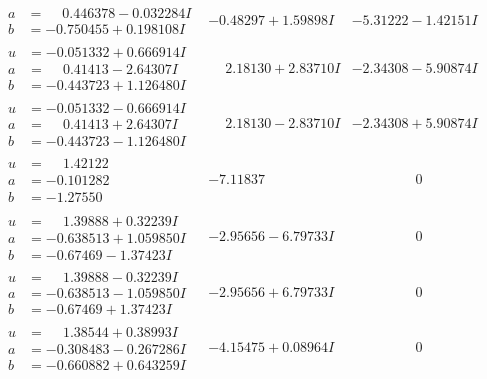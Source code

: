 \documentclass[1p]{elsarticle_modified}
\theoremstyle{definition}
\begin{document}
$$\begin{array}{c|c|c}
\begin{aligned}
a &= \phantom{-}0.446378 - 0.032284 I \\
b &= -0.750455 + 0.198108 I\end{aligned}
 & -0.48297 + 1.59898 I & -5.31222 - 1.42151 I \\ \hline\begin{aligned}
u &= -0.051332 + 0.666914 I \\
a &= \phantom{-}0.41413 - 2.64307 I \\
b &= -0.443723 + 1.126480 I\end{aligned}
 & \phantom{-}2.18130 + 2.83710 I & -2.34308 - 5.90874 I \\ \hline\begin{aligned}
u &= -0.051332 - 0.666914 I \\
a &= \phantom{-}0.41413 + 2.64307 I \\
b &= -0.443723 - 1.126480 I\end{aligned}
 & \phantom{-}2.18130 - 2.83710 I & -2.34308 + 5.90874 I \\ \hline\begin{aligned}
u &= \phantom{-}1.42122\phantom{ +0.000000I} \\
a &= -0.101282\phantom{ +0.000000I} \\
b &= -1.27550\phantom{ +0.000000I}\end{aligned}
 & -7.11837\phantom{ +0.000000I} & \phantom{-0.000000 } 0 \\ \hline\begin{aligned}
u &= \phantom{-}1.39888 + 0.32239 I \\
a &= -0.638513 + 1.059850 I \\
b &= -0.67469 - 1.37423 I\end{aligned}
 & -2.95656 - 6.79733 I & \phantom{-0.000000 } 0 \\ \hline\begin{aligned}
u &= \phantom{-}1.39888 - 0.32239 I \\
a &= -0.638513 - 1.059850 I \\
b &= -0.67469 + 1.37423 I\end{aligned}
 & -2.95656 + 6.79733 I & \phantom{-0.000000 } 0 \\ \hline\begin{aligned}
u &= \phantom{-}1.38544 + 0.38993 I \\
a &= -0.308483 - 0.267286 I \\
b &= -0.660882 + 0.643259 I\end{aligned}
 & -4.15475 + 0.08964 I & \phantom{-0.000000 } 0 \\ \hline\begin{aligned}

\end{aligned}
\end{array}$$
\end{document}
